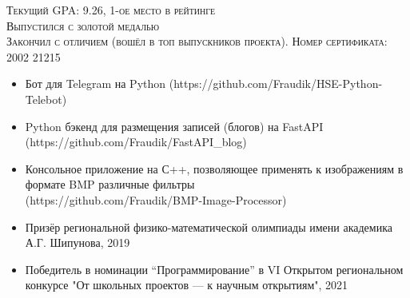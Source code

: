 \documentclass[10pt,a4paper]{altacv}
\begin{document}
\tagline{}

\begin{fullwidth}
\makecvheader
\end{fullwidth}


\textsc{Текущий GPA: 9.26, 1-ое место в рейтинге}
\\
\vspace{10pt}
\textsc{Выпустился с золотой медалью}
\\
\vspace{10pt}
\textsc{Закончил с отличием (вошёл в топ выпускников проекта). Номер сертификата: 2002 21215}
\\
\vspace{10pt}
\textsc{}


\begin{itemize}
\item Бот для Telegram на Python
(https://github.com/Fraudik/HSE-Python-Telebot)
\item Python бэкенд для размещения записей (блогов) на FastAPI
(https://github.com/Fraudik/FastAPI\_blog)
\item  Консольное приложение на С++, позволяющее применять к изображениям в формате BMP различные фильтры \\
(https://github.com/Fraudik/BMP-Image-Processor)
\end{itemize}

\begin{itemize}
\item Призёр региональной физико-математической олимпиады имени академика А.Г. Шипунова, 2019
\item Победитель в номинации “Программирование” в VI Открытом региональном конкурсе "От школьных проектов --- к научным открытиям", 2021
\end{itemize}

\clearpage
\end{document}
